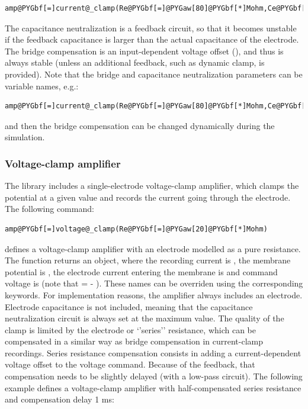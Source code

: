 \documentclass[letterpaper,10pt,english]{manual}
\begin{document}
\begin{Verbatim}[commandchars=@\[\]]
amp@PYGbf[=]current@_clamp(Re@PYGbf[=]@PYGaw[80]@PYGbf[*]Mohm,Ce@PYGbf[=]@PYGaw[10]@PYGbf[*]pF,bridge@PYGbf[=]@PYGaw[78]@PYGbf[*]Mohm,capa@_comp@PYGbf[=]@PYGaw[8]@PYGbf[*]pF)
\end{Verbatim}

The capacitance neutralization is a feedback circuit, so that it becomes unstable if
the feedback capacitance is larger than the actual capacitance of the electrode.
The bridge compensation is an input-dependent voltage offset (), and
thus is always stable (unless an additional feedback, such as dynamic clamp, is provided).
Note that the bridge and capacitance neutralization parameters can be variable names, e.g.:

\begin{Verbatim}[commandchars=@\[\]]
amp@PYGbf[=]current@_clamp(Re@PYGbf[=]@PYGaw[80]@PYGbf[*]Mohm,Ce@PYGbf[=]@PYGaw[10]@PYGbf[*]pF,bridge@PYGbf[=]@PYGad[']@PYGad[Rbridge]@PYGad['],capa@_comp@PYGbf[=]@PYGaw[8]@PYGbf[*]pF)
\end{Verbatim}

and then the bridge compensation can be changed dynamically during the simulation.


\subsubsection{Voltage-clamp amplifier}

The library includes a single-electrode voltage-clamp amplifier, which
clamps the potential at a given value and records the current going through
the electrode.
The following command:

\begin{Verbatim}[commandchars=@\[\]]
amp@PYGbf[=]voltage@_clamp(Re@PYGbf[=]@PYGaw[20]@PYGbf[*]Mohm)
\end{Verbatim}

defines a voltage-clamp amplifier with an electrode modelled as a pure
resistance.
The function
returns an \hyperlink{brian.Equations}{} object, where
the recording current is , the membrane potential is , the electrode current
entering the membrane is  and command voltage is 
(note that  = - ).
These names can be overriden using the corresponding keywords.
For implementation reasons, the amplifier always includes an electrode.
Electrode capacitance is not included, meaning that
the capacitance neutralization circuit is always set at the maximum value.
The quality of the clamp is limited by the electrode or `'series'' resistance,
which can be compensated in a similar way as bridge compensation in current-clamp
recordings. Series resistance compensation consists in adding a current-dependent
voltage offset to the voltage command. Because of the feedback, that compensation needs
to be slightly delayed (with a low-pass circuit). The following example defines a
voltage-clamp amplifier with half-compensated series resistance and compensation delay
1 ms:
\end{document}
